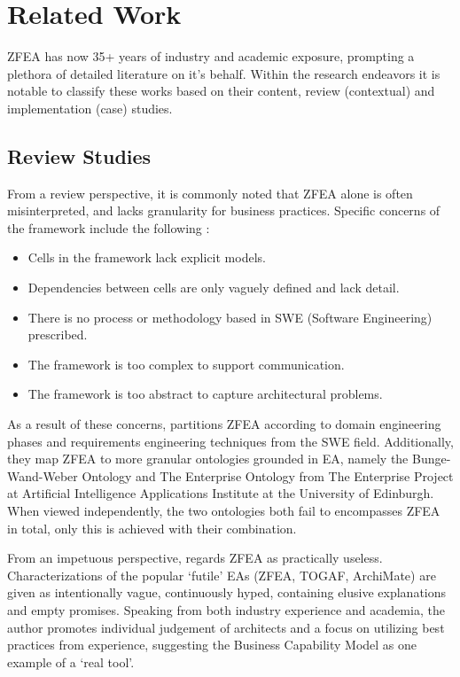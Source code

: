 \documentclass[12pt,conference]{IEEEtran}
\begin{document}
\section{Related Work}
ZFEA has now 35+ years of industry and academic exposure, prompting a plethora of detailed literature on it's behalf.
Within the research endeavors it is notable to classify these works based on their content, review (contextual) and implementation (case) studies.

\subsection{Review Studies}
From a review perspective, it is commonly noted that ZFEA alone is often misinterpreted, and lacks granularity for business practices.
Specific concerns of the framework include the following \cite{rediscovering_zachman,fake_and_real_tools}:
\begin{itemize}
    \item Cells in the framework lack explicit models.
    \item Dependencies between cells are only vaguely defined and lack detail.
    \item There is no process or methodology based in SWE (Software Engineering) prescribed.
    \item The framework is too complex to support communication.
    \item The framework is too abstract to capture architectural problems.
\end{itemize}

As a result of these concerns, \cite{rediscovering_zachman} partitions ZFEA according to domain engineering phases and requirements engineering techniques from the SWE field.
Additionally, they map ZFEA to more granular ontologies grounded in EA, namely the Bunge-Wand-Weber Ontology and The Enterprise Ontology from The Enterprise Project at Artificial Intelligence Applications Institute at the University of Edinburgh.
When viewed independently, the two ontologies both fail to encompasses ZFEA in total, only this is achieved with their combination.

From an impetuous perspective, \cite{fake_and_real_tools} regards ZFEA as practically useless.
Characterizations of the popular `futile' EAs (ZFEA, TOGAF, ArchiMate) are given as intentionally vague, continuously hyped, containing elusive explanations and empty promises.
Speaking from both industry experience and academia, the author promotes individual judgement of architects and a focus on utilizing best practices from experience, suggesting the Business Capability Model as one example of a `real tool'.
\end{document}
